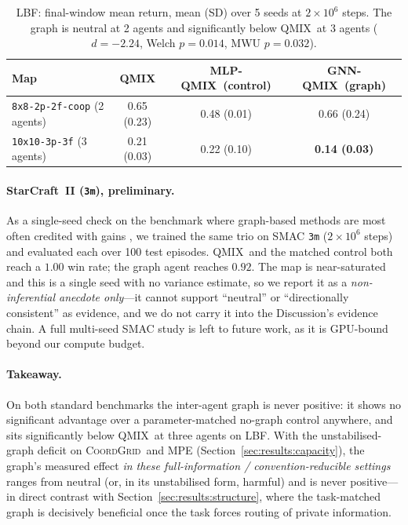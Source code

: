 \documentclass[10pt]{article}
\newcommand{\algoname}[1]{\textsc{#1}}
\newcommand{\qmix}{\algoname{QMIX}}
\newcommand{\gnnqmix}{\algoname{GNN-QMIX}}
\newcommand{\coordgrid}{\textsc{CoordGrid}}
\newcommand{\mlpqmix}{\algoname{MLP-QMIX}}
\begin{document}
\begin{table}[htbp]
  \centering
  \small
  \caption{LBF: final-window mean return, mean (SD) over 5 seeds at
  $2\times10^6$ steps. The graph is neutral at 2 agents and significantly
  below \qmix\ at 3 agents ($d=-2.24$, Welch $p=0.014$, MWU $p=0.032$).}
  \label{tab:lbf}
  \begin{tabular}{lccc}
    \toprule
    Map & \qmix & \mlpqmix\ (control) & \gnnqmix\ (graph) \\
    \midrule
    \texttt{8x8-2p-2f-coop} (2 agents) & 0.65 (0.23) & 0.48 (0.01) & 0.66 (0.24) \\
    \texttt{10x10-3p-3f} (3 agents)    & 0.21 (0.03) & 0.22 (0.10) & \textbf{0.14 (0.03)} \\
    \bottomrule
  \end{tabular}
\end{table}

\paragraph{StarCraft~II (\textup{\texttt{3m}}), preliminary.} As a single-seed check on
the benchmark where graph-based methods are most often credited with gains
\citep{samvelyan_2019_smac}, we trained the same trio on SMAC \texttt{3m}
($2\times10^6$ steps) and evaluated each over 100 test episodes. \qmix\ and the
matched control both reach a $1.00$ win rate; the graph agent reaches $0.92$.
The map is near-saturated and this is a single seed with no variance estimate,
so we report it as a \emph{non-inferential anecdote only}---it cannot support
``neutral'' or ``directionally consistent'' as evidence, and we do not carry it
into the Discussion's evidence chain. A full multi-seed SMAC study is left to
future work, as it is GPU-bound beyond our compute budget.

\paragraph{Takeaway.} On both standard benchmarks the inter-agent graph is
never positive: it shows no significant advantage over a parameter-matched
no-graph control anywhere, and sits significantly below \qmix\ at three
agents on LBF. With the unstabilised-graph deficit
on \coordgrid\ and MPE (Section~\ref{sec:results:capacity}), the
graph's measured effect \emph{in these full-information / convention-reducible
settings} ranges from neutral (or, in its unstabilised form, harmful) and is
never positive---in direct
contrast with Section~\ref{sec:results:structure}, where the task-matched
graph is decisively beneficial once the task forces routing of private
information.
\end{document}
